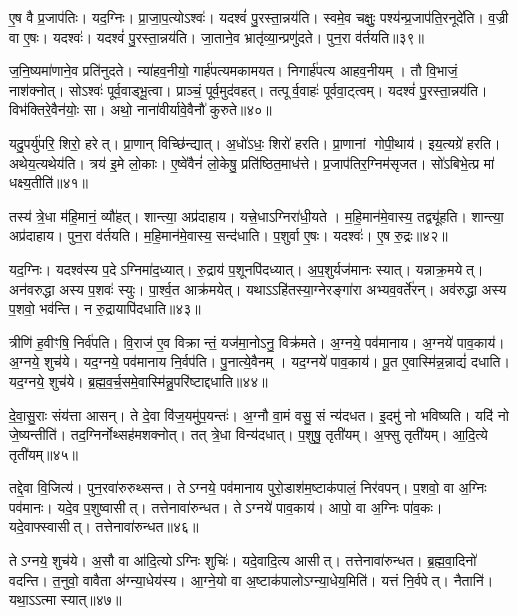 ए॒ष वै प्र॒जाप॑तिः।
यद॒ग्निः।
प्रा॒जा॒प॒त्यो\-ऽश्वः॑।
यदश्वं॑ पु॒रस्ता॒न्नय॑ति।
स्वमे॒व चक्षुः॒ पश्य॑न्प्र॒जाप॑ति॒रनूदे॑ति।
व॒ज्री वा ए॒षः।
यदश्वः॑।
यदश्वं॑ पु॒रस्ता॒न्नय॑ति।
जा॒ताने॒व भ्रातृ॑व्या॒न्प्रणु॑दते।
पुन॒रा व॑र्तयति॥३९॥

ज॒नि॒ष्यमा॑णाने॒व प्रति॑नुदते।
न्या॑हव॒नीयो॒ गार्\mbox{}ह॑पत्य\-मकामयत।
निगार्\mbox{}ह॑पत्य आहव॒नीयम्।
तौ वि॒भाजं॒ नाश॑क्नोत्।
सोऽश्वः॑ पूर्व॒वाड्भू॒त्वा।
प्राञ्चं॒ पूर्व॒मुद॑वहत्।
तत्पूर्व॒वाहः॑ पूर्ववा॒ट्त्वम्।
यदश्वं॑ पु॒रस्ता॒न्नय॑ति।
विभ॑क्ति\-रे॒वैन॑योः॒ सा।
अथो॒ नाना॑वीर्यावे॒वैनौ॑ कुरुते॥४०॥

यदु॒पर्यु॑परि॒ शिरो॒ हरेत्।
प्रा॒णान्‌ विच्छि॑न्द्यात्।
अ॒धो॑ऽधः॒ शिरो॑ हरति।
प्रा॒णानां गोपी॒थाय॑।
इय॒त्यग्रे॑ हरति।
अथेय॒त्यथेय॑ति।
त्रय॑ इ॒मे लो॒काः।
ए॒ष्वे॑वैनं॑ लो॒केषु॒ प्रति॑ष्ठित॒माध॑त्ते।
प्र॒जाप॑तिर॒ग्निम॑सृजत।
सो॑ऽबिभे॒त्प्र मा॑ धक्ष्य॒तीति॑॥४१॥

तस्य॑ त्रे॒धा म॑हि॒मानं॒ व्यौ॑हत्।
शान्त्या॒ अप्र॑दाहाय।
यत्त्रे॒धा\-ऽग्निरा॑धी॒यते।
म॒हि॒मान॑मे॒वास्य॒ तद्व्यू॑हति।
शान्त्या॒ अप्र॑दाहाय।
पुन॒रा व॑र्तयति।
म॒हि॒मान॑मे॒वास्य॒ सन्द॑धाति।
प॒शुर्वा ए॒षः।
यदश्वः॑।
ए॒ष रु॒द्रः॥४२॥

यद॒ग्निः।
यदश्व॑स्य प॒दे\-ऽग्निमा॑द॒ध्यात्।
रु॒द्राय॑ प॒शूनपि॑\-दध्यात्।
अ॒प॒शुर्यज॑मानः स्यात्।
यन्नाक्र॒मयेत्।
अन॑वरुद्धा अस्य प॒शवः॑ स्युः।
पा॒र्श्व॒त आक्र॑मयेत्।
यथाऽऽहि॑तस्या॒ग्नेरङ्गा॑रा अभ्यव॒वर्ते॑रन्।
अव॑रुद्धा अस्य प॒शवो॒ भव॑न्ति।
न रु॒द्रायापि॑दधाति॥४३॥

त्रीणि॑ ह॒वीꣳषि॒ निर्व॑पति।
वि॒राज॑ ए॒व विक्रान्तं॒ यज॑मा॒नोऽनु॒ विक्र॑मते।
अ॒ग्नये॒ पव॑मानाय।
अ॒ग्नये॑ पाव॒काय॑।
अ॒ग्नये॒ शुच॑ये।
यद॒ग्नये॒ पव॑मानाय नि॒र्वप॑ति।
पु॒नात्ये॒वैनम्।
यद॒ग्नये॑ पाव॒काय॑।
पू॒त ए॒वास्मि॑न्न॒न्नाद्यं॑ दधाति।
यद॒ग्नये॒ शुच॑ये।
ब्र॒ह्म॒व॒र्च॒समे॒वास्मि॑न्नु॒परि॑ष्टाद्दधाति॥४४॥\anuvakamend[ए॒न॒मा॒ह॒व॒नीयं॑ धत्ते\-ऽश्व॒त्वं व॑र्तयति कुरुत॒ इति॑ रु॒द्रो द॑धाति॒ यद॒ग्नये॒ शुच॑य॒ एकं॑ च]

दे॒वा॒सु॒राः संय॑त्ता आसन्।
ते दे॒वा वि॑ज॒यमु॑प॒यन्तः॑।
अ॒ग्नौ वा॒मं वसु॒ सं न्य॑दधत।
इ॒दमु॑ नो भविष्यति।
यदि॑ नो जे॒ष्यन्तीति॑।
तद॒ग्निर्नोथ्सह॑मशक्नोत्।
तत् त्रे॒धा विन्य॑दधात्।
प॒शुषु॒ तृती॑यम्।
अ॒फ्सु तृती॑यम्।
आ॒दि॒त्ये तृती॑यम्॥४५॥

तद्दे॒वा वि॒जित्य॑।
पुन॒रवा॑रुरुथ्सन्त।
तेऽग्नये॒ पव॑मानाय पुरो॒डाश॑म॒ष्टाक॑पालं॒ निर॑वपन्।
प॒शवो॒ वा अ॒ग्निः पव॑मानः।
यदे॒व प॒शुष्वासीत्।
तत्तेनावा॑रुन्धत।
तेऽग्नये॑ पाव॒काय॑।
आपो॒ वा अ॒ग्निः पा॑व॒कः।
यदे॒वाफ्स्वासीत्।
तत्तेनावा॑रुन्धत॥४६॥

तेऽग्नये॒ शुच॑ये।
अ॒सौ वा आ॑दि॒त्यो\-ऽग्निः शुचिः॑।
यदे॒वादि॒त्य आसीत्।
तत्तेनावा॑रुन्धत।
ब्र॒ह्म॒वा॒दिनो॑ वदन्ति।
त॒नुवो॒ वावैता अ॑ग्न्या॒धेय॑स्य।
आ॒ग्ने॒यो वा अ॒ष्टाक॑पालो\-ऽग्न्या॒धेय॒मिति॑।
यत्तं नि॒र्वपेत्।
नैतानि॑।
यथा॒ऽऽत्मा स्यात्॥४७॥

